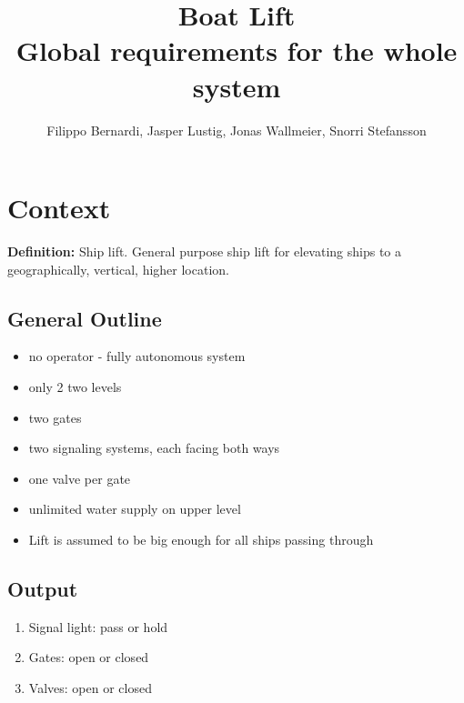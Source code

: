 \documentclass{article}
\begin{document}
\title{\huge{Boat Lift} \\ {\fontsize{13}{1} \selectfont Global requirements for the whole system} }
\author{Filippo Bernardi, Jasper Lustig, Jonas Wallmeier, Snorri Stefansson}

\maketitle



\vspace{3cm}

\section{Context}
\textbf{Definition:}
Ship lift. General purpose ship lift for elevating ships to a geographically, vertical, higher location. \\
\subsection{General Outline}
\begin{itemize}
	\item no operator - fully autonomous system
	\item only 2 two levels
	\item two gates
	\item two signaling systems, each facing both ways
	\item one valve per gate
	\item unlimited water supply on upper level
	\item Lift is assumed to be big enough for all ships passing through
\end{itemize}
\pagebreak

\subsection{Output}
\begin{enumerate}
	\item Signal light: pass or hold
	\item Gates: open or closed
	\item Valves: open or closed
\end{enumerate}
\end{document}
